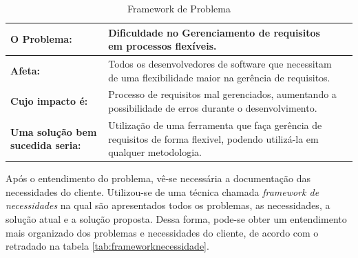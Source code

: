 \begin{table}[htbp]
\centering
\begin{tabular}{|p{2.5cm}|p{10cm}|p{2.5cm}|}
\hline
\textbf{O Problema:} &
Dificuldade no Gerenciamento de requisitos em processos flexíveis. 
\\ \hline
\textbf{Afeta:} &
Todos os desenvolvedores de software que necessitam de uma flexibilidade maior na gerência de requisitos.
\\ \hline
\textbf{Cujo impacto é:} &
Processo de requisitos mal gerenciados, aumentando a possibilidade de erros durante o desenvolvimento.
\\ \hline
\textbf{Uma solução bem sucedida seria:} &
Utilização de uma ferramenta que faça gerência de requisitos de forma flexivel, podendo utilizá-la em qualquer metodologia.
\\ \hline
\end{tabular}
\caption{Framework de Problema}
\label{tab:frameworkproblema}
\end{table}

Após o entendimento do problema, vê-se necessária a documentação das necessidades do cliente. Utilizou-se de uma técnica chamada \textit{framework de necessidades} na qual são apresentados todos os problemas, as necessidades, a solução atual e a solução proposta. Dessa forma, pode-se obter um entendimento mais organizado dos problemas e necessidades do cliente, de acordo com o retradado na tabela \ref{tab:frameworknecessidade}.

